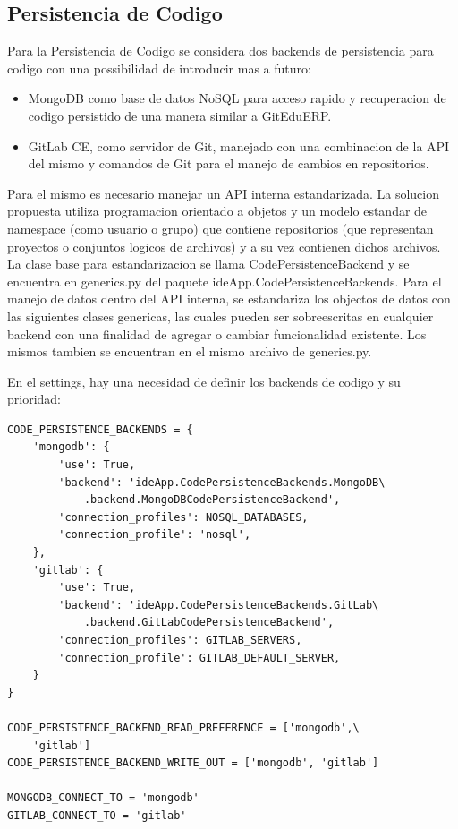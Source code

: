 \subsection{Persistencia de Codigo}
Para la Persistencia de Codigo se considera dos backends de persistencia para codigo con una possibilidad de introducir mas a futuro:
\begin{itemize}
	\item MongoDB como base de datos NoSQL para acceso rapido y recuperacion de codigo persistido de una manera similar a GitEduERP.
    \item GitLab CE, como servidor de Git, manejado con una combinacion de la API del mismo y comandos de Git para el manejo de cambios en repositorios.
\end{itemize}

Para el mismo es necesario manejar un API interna estandarizada. La solucion propuesta utiliza programacion orientado a objetos y un modelo estandar de namespace (como usuario o grupo) que contiene repositorios (que representan proyectos o conjuntos logicos de archivos) y a su vez contienen dichos archivos. La clase base para estandarizacion se llama CodePersistenceBackend y se encuentra en generics.py del paquete ideApp.CodePersistenceBackends. Para el manejo de datos dentro del API interna, se estandariza los objectos de datos con las siguientes clases genericas, las cuales pueden ser sobreescritas en cualquier backend con una finalidad de agregar o cambiar funcionalidad existente. Los mismos tambien se encuentran en el mismo archivo de generics.py.

En el settings, hay una necesidad de definir los backends de codigo y su prioridad:
\lstset{language=Python}
\begin{lstlisting}
CODE_PERSISTENCE_BACKENDS = {
    'mongodb': {
        'use': True,
        'backend': 'ideApp.CodePersistenceBackends.MongoDB\
            .backend.MongoDBCodePersistenceBackend',
        'connection_profiles': NOSQL_DATABASES,
        'connection_profile': 'nosql',
    },
    'gitlab': {
        'use': True,
        'backend': 'ideApp.CodePersistenceBackends.GitLab\
            .backend.GitLabCodePersistenceBackend',
        'connection_profiles': GITLAB_SERVERS,
        'connection_profile': GITLAB_DEFAULT_SERVER,
    }
}

CODE_PERSISTENCE_BACKEND_READ_PREFERENCE = ['mongodb',\
    'gitlab']
CODE_PERSISTENCE_BACKEND_WRITE_OUT = ['mongodb', 'gitlab']

MONGODB_CONNECT_TO = 'mongodb'
GITLAB_CONNECT_TO = 'gitlab'
\end{lstlisting}
\lstset{language=Bash}


